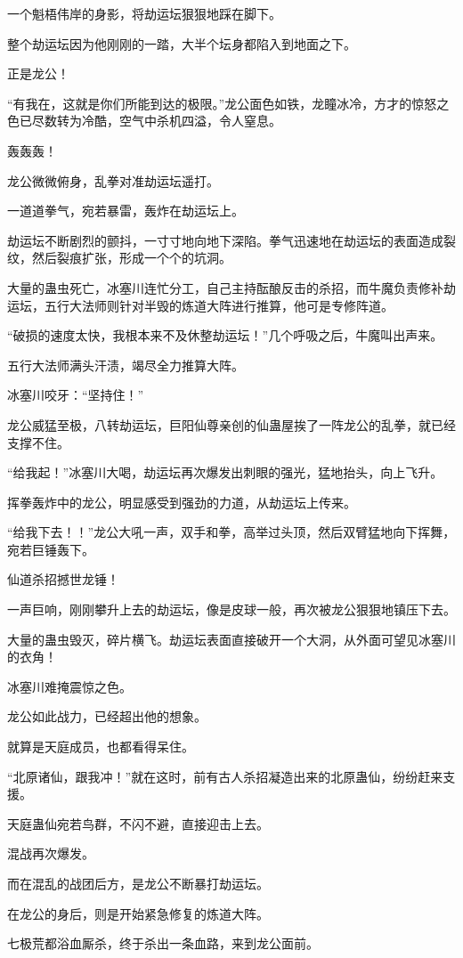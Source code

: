 \begin{this_body}
一个魁梧伟岸的身影，将劫运坛狠狠地踩在脚下。

整个劫运坛因为他刚刚的一踏，大半个坛身都陷入到地面之下。

正是龙公！

“有我在，这就是你们所能到达的极限。”龙公面色如铁，龙瞳冰冷，方才的惊怒之色已尽数转为冷酷，空气中杀机四溢，令人窒息。

轰轰轰！

龙公微微俯身，乱拳对准劫运坛遥打。

一道道拳气，宛若暴雷，轰炸在劫运坛上。

劫运坛不断剧烈的颤抖，一寸寸地向地下深陷。拳气迅速地在劫运坛的表面造成裂纹，然后裂痕扩张，形成一个个的坑洞。

大量的蛊虫死亡，冰塞川连忙分工，自己主持酝酿反击的杀招，而牛魔负责修补劫运坛，五行大法师则针对半毁的炼道大阵进行推算，他可是专修阵道。

“破损的速度太快，我根本来不及休整劫运坛！”几个呼吸之后，牛魔叫出声来。

五行大法师满头汗渍，竭尽全力推算大阵。

冰塞川咬牙：“坚持住！”

龙公威猛至极，八转劫运坛，巨阳仙尊亲创的仙蛊屋挨了一阵龙公的乱拳，就已经支撑不住。

“给我起！”冰塞川大喝，劫运坛再次爆发出刺眼的强光，猛地抬头，向上飞升。

挥拳轰炸中的龙公，明显感受到强劲的力道，从劫运坛上传来。

“给我下去！！”龙公大吼一声，双手和拳，高举过头顶，然后双臂猛地向下挥舞，宛若巨锤轰下。

仙道杀招撼世龙锤！

一声巨响，刚刚攀升上去的劫运坛，像是皮球一般，再次被龙公狠狠地镇压下去。

大量的蛊虫毁灭，碎片横飞。劫运坛表面直接破开一个大洞，从外面可望见冰塞川的衣角！

冰塞川难掩震惊之色。

龙公如此战力，已经超出他的想象。

就算是天庭成员，也都看得呆住。

“北原诸仙，跟我冲！”就在这时，前有古人杀招凝造出来的北原蛊仙，纷纷赶来支援。

天庭蛊仙宛若鸟群，不闪不避，直接迎击上去。

混战再次爆发。

而在混乱的战团后方，是龙公不断暴打劫运坛。

在龙公的身后，则是开始紧急修复的炼道大阵。

七极荒都浴血厮杀，终于杀出一条血路，来到龙公面前。


\end{this_body}
